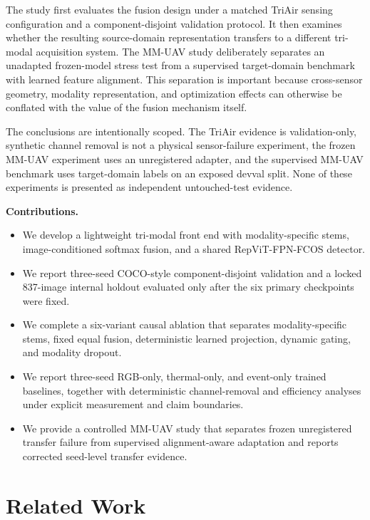 \documentclass[pdflatex,sn-basic,Numbered,iicol]{sn-jnl}
\begin{document}
The study first evaluates the fusion design under a matched TriAir sensing configuration and a component-disjoint validation protocol. It then examines whether the resulting source-domain representation transfers to a different tri-modal acquisition system. The MM-UAV study deliberately separates an unadapted frozen-model stress test from a supervised target-domain benchmark with learned feature alignment. This separation is important because cross-sensor geometry, modality representation, and optimization effects can otherwise be conflated with the value of the fusion mechanism itself.

The conclusions are intentionally scoped. The TriAir evidence is validation-only, synthetic channel removal is not a physical sensor-failure experiment, the frozen MM-UAV experiment uses an unregistered adapter, and the supervised MM-UAV benchmark uses target-domain labels on an exposed devval split. None of these experiments is presented as independent untouched-test evidence.

\noindent\textbf{Contributions.}
\begin{itemize}
    \item We develop a lightweight tri-modal front end with modality-specific stems, image-conditioned softmax fusion, and a shared RepViT-FPN-FCOS detector.
    \item We report three-seed COCO-style component-disjoint validation and a locked 837-image internal holdout evaluated only after the six primary checkpoints were fixed.
    \item We complete a six-variant causal ablation that separates modality-specific stems, fixed equal fusion, deterministic learned projection, dynamic gating, and modality dropout.
    \item We report three-seed RGB-only, thermal-only, and event-only trained baselines, together with deterministic channel-removal and efficiency analyses under explicit measurement and claim boundaries.
    \item We provide a controlled MM-UAV study that separates frozen unregistered transfer failure from supervised alignment-aware adaptation and reports corrected seed-level transfer evidence.
\end{itemize}

\section{Related Work}
\end{document}
